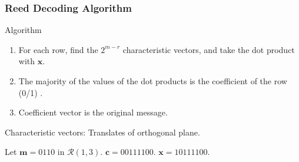 \documentclass[xcolor=xvgnames]{beamer}
\newcommand{\RM}[2]{\ensuremath{\mathcal{R}(#1,#2)}}
\newcommand{\V}[1]{\ensuremath{\mathbf{#1}}}
\begin{document}


\begin{frame}
  \frametitle{Reed Decoding Algorithm}
  \begin{block}{Algorithm}
    \begin{enumerate}
    \item For each row, find the $2^{m-r}$ \alert{characteristic vectors}, and take the dot product with $\V{x}$. 
    \item The majority of the values of the dot products is the coefficient of the row (0/1) .
      \item Coefficient vector is the original message.
    \end{enumerate}
Characteristic vectors: Translates of orthogonal plane.
  \end{block}

  \begin{example}
Let $\V{m} = 0110$ in $\RM{1}{3}$. $\V{c} = 00111100$. $\V{x} = 10111100$.
  \end{example}
\end{frame}

\end{document}
